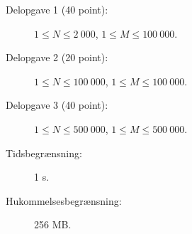 \documentclass{boi2014-dk}
\begin{document}
    \Scoring

    \begin{description}
        \item[Delopgave 1 (40 point):] $1 \le N \le 2\ 000$, $1 \le M \le 100\ 000$.
        \item[Delopgave 2 (20 point):] $1 \le N \le 100\ 000$, $1 \le M \le 100\ 000$.
        \item[Delopgave 3 (40 point):] $1 \le N \le 500\ 000$, $1 \le M \le 500\ 000$.
    \end{description}

    \Constraints

    \begin{description}
        \item[Tidsbegrænsning:] 1 s.
        \item[Hukommelsesbegrænsning:] 256 MB.
    \end{description}
\end{document}
